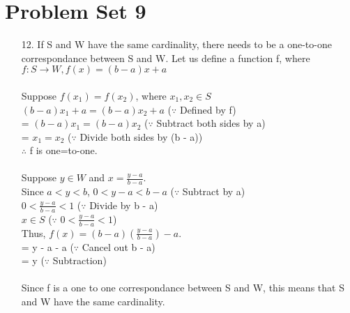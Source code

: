 \documentclass[12pt]{article}
\begin{document}
\section*{Problem Set 9}
\begin{itemize}
    \item [12.]
        If S and W have the same cardinality, there needs to be a one-to-one correspondance
        between S and W. Let us define a function f, where $f: S \rightarrow W,
        f(x) = (b - a)x + a$ \\
        \\
        Suppose $f(x_1) = f(x_2)$, where $x_1, x_2 \in S$ \\
        $(b - a)x_1 + a = (b - a)x_2 + a$ \hspace{3em} ($\because$ Defined by f) \\
        = $(b - a)x_1 = (b - a)x_2$ \hspace{5em} ($\because$ Subtract both sides by a) \\
        = $x_1 = x_2$ \hspace{10em} ($\because$ Divide both sides by (b - a)) \\
        $\therefore$ f is one=to-one. \\
        \\
        Suppose $y \in W$ and $x = \frac{y - a}{b - a}$. \\
        Since $a < y < b$, $0 < y - a < b - a$ \hspace{3em} ($\because$ Subtract by a) \\
        $0 < \frac{y - a}{b - a} < 1$ \hspace{10em} ($\because$ Divide by b - a) \\
        $x \in S$ \hspace{14em} ($\because$ $0 < \frac{y - a}{b - a} < 1$) \\
        Thus, $f(x) = (b - a)(\frac{y - a}{b - a}) - a$. \\
        = y - a - a \hspace{10em} ($\because$ Cancel out b - a) \\
        = y \hspace{10em} ($\because$ Subtraction) \\
        \\
        Since f is a one to one correspondance between S and W, this means that S and
        W have the same cardinality.

\end{itemize}
\end{document}
